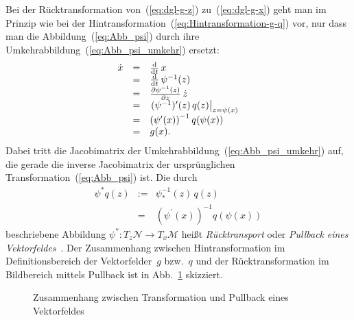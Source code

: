 Bei der Rücktransformation von~(\ref{eq:dgl-g-z}) zu~(\ref{eq:dgl-g-x})
geht man im Prinzip wie bei der Hintransformation~(\ref{eq:Hintransformation-g-q})
vor, nur dass man die Abbildung~(\ref{eq:Abb_psi}) durch ihre Umkehrabbildung~(\ref{eq:Abb_psi_umkehr})
ersetzt: 
\begin{equation}
\begin{array}{rcl}
\dot{x} & = & \frac{\mathrm{d}}{\mathrm{d} t}\,x\\
 & = & \frac{\mathrm{d}}{\mathrm{d} t}\,\psi^{-1}(z)\\
 & = & \frac{\partial\psi^{-1}(z)}{\partial z}\,\dot{z}\\
 & = & \left.(\psi^{-1})^{\prime}(z)\,q(z)\right|_{z=\psi(x)}\\
 & = & \left(\psi^{\prime}(x)\right)^{-1}q(\psi(x))\\
 & = & g(x).
\end{array}\label{eq:Ruecktransformation-q-g}
\end{equation}
Dabei tritt die Jacobimatrix der Umkehrabbildung~(\ref{eq:Abb_psi_umkehr})
auf, die gerade die inverse Jacobimatrix der ursprünglichen Transformation~(\ref{eq:Abb_psi})
ist. Die durch 
\begin{equation}
\begin{array}{rrl}
\psi^{*}q(z) & := & \psi_{*}^{-1}(z)\,q(z)\\
 & = & \left(\psi^{\prime}(x)\right)^{-1}q(\psi(x))
\end{array}\label{eq:pull-back-vektor}
\end{equation}
beschriebene Abbildung $\psi^{*}:T_{z}\mathcal{N}\to T_{x}\mathcal{M}$
heißt \emph{Rücktransport}
oder \emph{Pullback} \emph{eines Vektorfeldes}~\cite{marsden2001}.
Der Zusammenhang zwischen Hintransformation im Definitionsbereich
der Vektor\-felder~$g$ bzw.~$q$ und der Rücktransformation im
Bildbereich mittels Pullback ist in Abb.~\ref{fig:Pullback-Vektorfeld}
skizziert.

\begin{figure}
\begin{centering}
\resizebox{0.95\textwidth}{!}{}
\par\end{centering}
\caption{Zusammenhang zwischen Transformation und Pullback eines Vektorfeldes\label{fig:Pullback-Vektorfeld}}
\end{figure}

